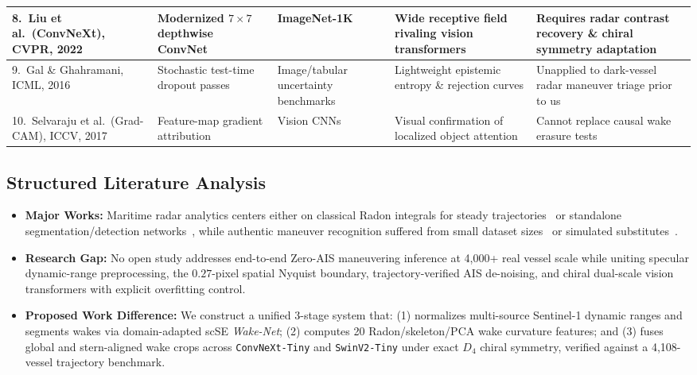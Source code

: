 \documentclass[11pt,a4paper]{article}
\begin{document}
{\begin{longtable}{|p{2.5cm}|p{2.7cm}|p{2.1cm}|p{2.9cm}|p{2.7cm}|}
8.\ Liu et al.\ (ConvNeXt), CVPR, 2022~\cite{liu2022convnext} & Modernized $7\times 7$ depthwise ConvNet & ImageNet-1K & Wide receptive field rivaling vision transformers & Requires radar contrast recovery \& chiral symmetry adaptation \\ \hline
9.\ Gal \& Ghahramani, ICML, 2016~\cite{gal2016dropout} & Stochastic test-time dropout passes & Image/tabular uncertainty benchmarks & Lightweight epistemic entropy \& rejection curves & Unapplied to dark-vessel radar maneuver triage prior to us \\ \hline
10.\ Selvaraju et al.\ (Grad-CAM), ICCV, 2017~\cite{selvaraj2017gradcam} & Feature-map gradient attribution & Vision CNNs & Visual confirmation of localized object attention & Cannot replace causal wake erasure tests \\ \hline
\end{longtable}
}

\subsection{Structured Literature Analysis}
\begin{itemize}[leftmargin=1.5em]
    \item \textbf{Major Works:} Maritime radar analytics centers either on classical Radon integrals for steady trajectories~\cite{graziano2016ship} or standalone segmentation/detection networks~\cite{zhang2023wakenet,xu2024opensarwake}, while authentic maneuver recognition suffered from small dataset sizes~\cite{mazzeo2026ueikap} or simulated substitutes~\cite{higgins2023machine}.
    \item \textbf{Research Gap:} No open study addresses end-to-end Zero-AIS maneuvering inference at 4,000+ real vessel scale while uniting specular dynamic-range preprocessing, the $0.27$-pixel spatial Nyquist boundary, trajectory-verified AIS de-noising, and chiral dual-scale vision transformers with explicit overfitting control.
    \item \textbf{Proposed Work Difference:} We construct a unified 3-stage system that: (1) normalizes multi-source Sentinel-1 dynamic ranges and segments wakes via domain-adapted scSE \textit{Wake-Net}; (2) computes 20 Radon/skeleton/PCA wake curvature features; and (3) fuses global and stern-aligned wake crops across \texttt{ConvNeXt-Tiny} and \texttt{SwinV2-Tiny} under exact $D_4$ chiral symmetry, verified against a 4,108-vessel trajectory benchmark.
\end{itemize}
\end{document}
